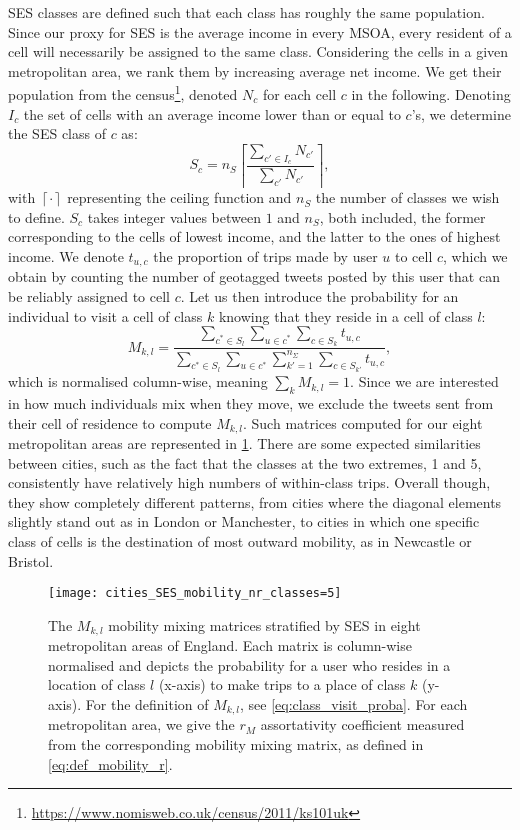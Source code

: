 \documentclass[../thesis.tex]{subfiles}
\begin{document}
\Ac{SES} classes are defined such that each class has roughly the same population. Since
our proxy for \ac{SES} is the average income in every \ac{MSOA}, every resident of a
cell will necessarily be assigned to the same class. Considering the cells in a given
metropolitan area, we rank them by increasing average net income. We get their
population from the
census\footnote{\url{https://www.nomisweb.co.uk/census/2011/ks101uk}}, denoted $N_c$ for
each cell $c$ in the following. Denoting $I_c$ the set of cells with an average income
lower than or equal to $c$'s, we determine the \ac{SES} class of $c$ as:
\begin{equation}
  S_c = n_S \left\lceil \frac{\sum_{c' \in I_c} N_{c'}}{\sum_{c'} N_{c'}} \right\rceil,
\end{equation}
with $\left\lceil \cdot \right\rceil$ representing the ceiling function and $n_S$ the
number of classes we wish to define. $S_c$ takes integer values between $1$ and $n_S$, both included, the former corresponding to the cells of lowest income, and the latter to the ones of highest income.
We denote $t_{u, c}$ the proportion of trips made by
user $u$ to cell $c$, which we obtain by counting the number of geotagged tweets posted
by this user that can be reliably assigned to cell $c$. Let us then introduce the
probability for an individual to visit a cell of class $k$ knowing that they reside in a cell of class $l$:
\begin{equation}
  \label{eq:class_visit_proba}
  M_{k, l} = \frac{
      \sum_{c^* \in S_l} \sum_{u \in c^*} \sum_{c \in S_k} t_{u, c}
    }{
      \sum_{c^* \in S_l} \sum_{u \in c^*} \sum_{k' = 1}^{n_{\Sigma}} \sum_{c \in S_{k'}} t_{u, c}
    },
\end{equation}
which is normalised column-wise, meaning $\sum_k M_{k, l} = 1$. Since we are interested in
how much individuals mix when they move, we exclude the tweets sent from their cell of
residence to compute $M_{k, l}$. Such matrices computed for our eight metropolitan areas
are represented in \cref{fig:cities_SES_mobility}. There are some expected similarities
between cities, such as the fact that the classes at the two extremes, 1 and 5,
consistently have relatively high numbers of within-class trips. Overall though, they
show completely different patterns, from cities where the diagonal elements slightly
stand out as in London or Manchester, to cities in which one specific class of cells is
the destination of most outward mobility, as in Newcastle or Bristol. 
\begin{figure}
\centering
  \texttt{[image: cities\_SES\_mobility\_nr\_classes=5]}
  \caption{The $M_{k, l}$ mobility mixing matrices stratified by SES in eight metropolitan areas of England. Each matrix is column-wise normalised and depicts the probability for a user who resides in a location of class $l$ (x-axis) to make trips to a place of class $k$ (y-axis). For the definition of $M_{k, l}$, see \cref{eq:class_visit_proba}. For each metropolitan area, we give the $r_M$ assortativity coefficient measured from the corresponding mobility mixing matrix, as defined in \cref{eq:def_mobility_r}.}
  \label{fig:cities_SES_mobility}
\end{figure}
\end{document}

